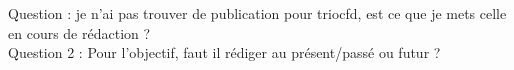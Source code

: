 \color{red} \noindent Question : je n'ai pas trouver de publication pour triocfd, est ce que je mets celle en cours de rédaction ? \\
Question 2 : Pour l'objectif, faut il rédiger au présent/passé ou futur ? \color{black}
%
%
